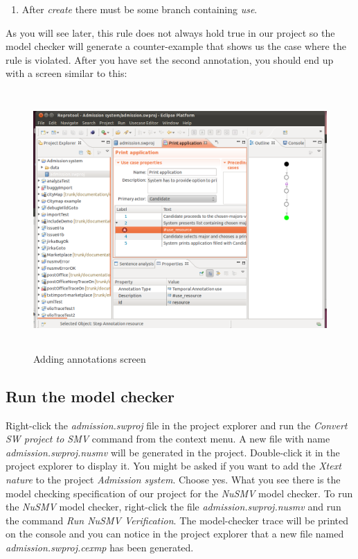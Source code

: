 \begin{enumerate}
 \item After \emph{create} there must be some branch containing \emph{use}.
\end{enumerate}

As you will see later, this rule does not always hold true in our project so the model checker will generate a counter-example that
shows us the case where the rule is violated. After you have set the second annotation, you should end up with a screen similar to this:

\newpage

\begin{figure}[ht]
  \centering
  \includegraphics[height=280pt]{images/reprotoolQuickTutorial2}
  \caption{Adding annotations screen}
  \label{fig:reprotoolQuickTutorial2}
\end{figure}

\subsection{Run the model checker}
Right-click the \emph{admission.swproj} file in the project explorer and run the \emph{Convert SW project to SMV} command from the
context menu. A new file with name \emph{admission.swproj.nusmv} will be generated in the project. Double-click it in the project
explorer to display it. You might be asked if you want to add the \emph{Xtext nature} to the project \emph{Admission system}. Choose yes.
What you see there is the model checking specification of our project for the \emph{NuSMV} model checker. To run the \emph{NuSMV} model
checker, right-click the file \emph{admission.swproj.nusmv} and run the command \emph{Run NuSMV Verification}. The model-checker trace
will be printed on the console and you can notice in the project explorer that a new file named \emph{admission.swproj.cexmp} has been
generated.

